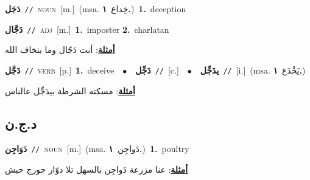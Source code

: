 \documentclass[10pt,a4paper,twoside]{article} %
\begin{document}
\begin{multicols}{2}
{\setlength\topsep{0pt}\textbf{\foreignlanguage{arabic}{دَجَل}}\ {\color{gray}\texttt{//}\color{black}}\ \textsc{noun}\ [m.]\ \color{gray}(msa. \foreignlanguage{arabic}{خِداع}~\foreignlanguage{arabic}{\textbf{١.}})\color{black}\ \textbf{1.}~deception\ } \vspace{2mm}

{\setlength\topsep{0pt}\textbf{\foreignlanguage{arabic}{دَجَّال}}\ {\color{gray}\texttt{//}\color{black}}\ \textsc{adj}\ [m.]\ \textbf{1.}~imposter  \textbf{2.}~charlatan\  \begin{flushright}\color{gray}\foreignlanguage{arabic}{\textbf{\underline{\foreignlanguage{arabic}{أمثلة}}}: أنت دَجّال وما بتخاف الله}\end{flushright}\color{black}} \vspace{2mm}

{\setlength\topsep{0pt}\textbf{\foreignlanguage{arabic}{دَجَّل}}\ {\color{gray}\texttt{//}\color{black}}\ \textsc{verb}\ [p.]\ \textbf{1.}~deceive\ \ $\bullet$\ \ \setlength\topsep{0pt}\textbf{\foreignlanguage{arabic}{دَجِّل}}\ {\color{gray}\texttt{//}\color{black}}\ [c.]\ \ $\bullet$\ \ \setlength\topsep{0pt}\textbf{\foreignlanguage{arabic}{يدَجِّل}}\ {\color{gray}\texttt{//}\color{black}}\ [i.]\ \color{gray}(msa. \foreignlanguage{arabic}{يَخْدَع}~\foreignlanguage{arabic}{\textbf{١.}})\color{black}\  \begin{flushright}\color{gray}\foreignlanguage{arabic}{\textbf{\underline{\foreignlanguage{arabic}{أمثلة}}}: مسكته الشرطة بيدَجِّل عالناس}\end{flushright}\color{black}} \vspace{2mm}

\vspace{-3mm}
\subsection*{\color{blue}\foreignlanguage{arabic}{د.ج.ن}\color{blue}{}} 

{\setlength\topsep{0pt}\textbf{\foreignlanguage{arabic}{دَوَاجِن}}\ {\color{gray}\texttt{//}\color{black}}\ \textsc{noun}\ [m.]\ \color{gray}(msa. \foreignlanguage{arabic}{دَواجِن}~\foreignlanguage{arabic}{\textbf{١.}})\color{black}\ \textbf{1.}~poultry\  \begin{flushright}\color{gray}\foreignlanguage{arabic}{\textbf{\underline{\foreignlanguage{arabic}{أمثلة}}}: عنا مزرعة دَواجِن بالسهل تلا دوّار جورج حبش}\end{flushright}\color{black}} \vspace{2mm}


\end{multicols}
\end{document}
